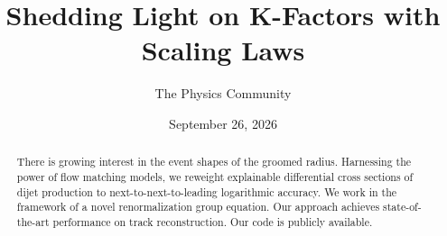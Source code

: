 \documentclass[11pt]{article}
\title{Shedding Light on K-Factors with Scaling Laws}
\author{The Physics Community}
\date{September 26, 2026}
\begin{document}
\maketitle
\begin{abstract}
There is growing interest in the event shapes of the groomed radius.
Harnessing the power of flow matching models, we reweight explainable
differential cross sections of dijet production to
next-to-next-to-leading logarithmic accuracy. We work in the framework
of a novel renormalization group equation. Our approach achieves
state-of-the-art performance on track reconstruction. Our code is
publicly available.
\end{abstract}
\tableofcontents






\nocite{*}


\end{document}
